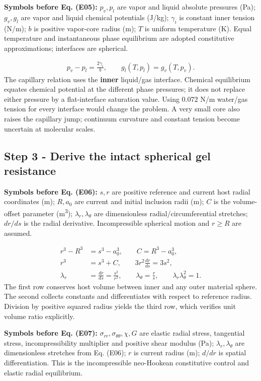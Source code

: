 \documentclass[10pt,a4paper]{article}
\begin{document}
\textbf{Symbols before Eq. (E05):} $p_v,p_l$ are vapor and liquid absolute pressures (Pa); $g_v,g_l$ are vapor and liquid chemical potentials (J/kg); $\gamma_i$ is constant inner tension (N/m); $b$ is positive vapor-core radius (m); $T$ is uniform temperature (K). Equal temperature and instantaneous phase equilibrium are adopted constitutive approximations; interfaces are spherical.

{\small\begin{align*}
p_v-p_l=\frac{2\gamma_i}{b},\qquad g_l(T,p_l)=g_v(T,p_v). \tag{E05}
\end{align*}}
The capillary relation uses the \textbf{inner} liquid/gas interface. Chemical equilibrium equates chemical potential at the different phase pressures; it does not replace either pressure by a flat-interface saturation value. Using 0.072 N/m water/gas tension for every interface would change the problem. A very small core also raises the capillary jump; continuum curvature and constant tension become uncertain at molecular scales.

\subsection*{Step 3  -  Derive the intact spherical gel resistance}
\textbf{Symbols before Eq. (E06):} $s,r$ are positive reference and current host radial coordinates (m); $R,a_0$ are current and initial inclusion radii (m); $C$ is the volume-offset parameter (m\textsuperscript{3}); $\lambda_r,\lambda_\theta$ are dimensionless radial/circumferential stretches; $d r/d s$ is the radial derivative. Incompressible spherical motion and $r\ge R$ are assumed.

{\small\begin{align*}
r^3-R^3&=s^3-a_0^3,\qquad C=R^3-a_0^3,\\
r^3&=s^3+C,\qquad 3r^2\frac{dr}{ds}=3s^2,\\
\lambda_r&=\frac{dr}{ds}=\frac{s^2}{r^2},\qquad
\lambda_\theta=\frac{r}{s},\qquad
\lambda_r\lambda_\theta^2=1. \tag{E06}
\end{align*}}
The first row conserves host volume between inner and any outer material sphere. The second collects constants and differentiates with respect to reference radius. Division by positive squared radius yields the third row, which verifies unit volume ratio explicitly.

\textbf{Symbols before Eq. (E07):} $\sigma_{rr},\sigma_{\theta\theta},\chi,G$ are elastic radial stress, tangential stress, incompressibility multiplier and positive shear modulus (Pa); $\lambda_r,\lambda_\theta$ are dimensionless stretches from Eq. (E06); $r$ is current radius (m); $d/dr$ is spatial differentiation. This is the incompressible neo-Hookean constitutive control and elastic radial equilibrium.
\end{document}
